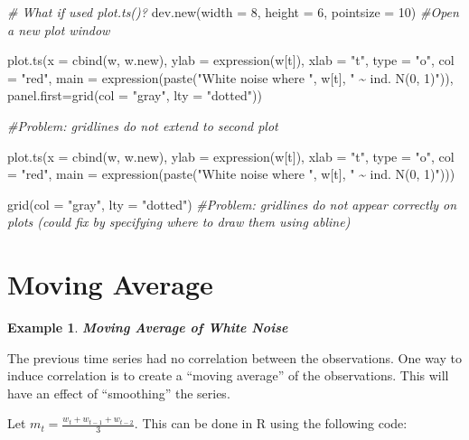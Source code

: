 \documentclass[
]{book}
\newenvironment{Shaded}{\begin{snugshade}}{\end{snugshade}}
\newcommand{\AttributeTok}[1]{\textcolor[rgb]{0.77,0.63,0.00}{#1}}
\newcommand{\CommentTok}[1]{\textcolor[rgb]{0.56,0.35,0.01}{\textit{#1}}}
\newcommand{\DecValTok}[1]{\textcolor[rgb]{0.00,0.00,0.81}{#1}}
\newcommand{\FunctionTok}[1]{\textcolor[rgb]{0.00,0.00,0.00}{#1}}
\newcommand{\NormalTok}[1]{#1}
\newcommand{\StringTok}[1]{\textcolor[rgb]{0.31,0.60,0.02}{#1}}
\theoremstyle{definition}
\theoremstyle{definition}
\newtheorem{example}{Example}[chapter]
\theoremstyle{definition}
\theoremstyle{definition}
\theoremstyle{remark}
\begin{document}
\begin{Shaded}
\begin{Highlighting}[]
\CommentTok{\# What if used plot.ts()?}
\FunctionTok{dev.new}\NormalTok{(}\AttributeTok{width =} \DecValTok{8}\NormalTok{, }\AttributeTok{height =} \DecValTok{6}\NormalTok{, }\AttributeTok{pointsize =} \DecValTok{10}\NormalTok{) }\CommentTok{\#Open a new plot window}

\FunctionTok{plot.ts}\NormalTok{(}\AttributeTok{x =} \FunctionTok{cbind}\NormalTok{(w, w.new), }\AttributeTok{ylab =} \FunctionTok{expression}\NormalTok{(w[t]), }\AttributeTok{xlab =} \StringTok{"t"}\NormalTok{, }\AttributeTok{type =} \StringTok{"o"}\NormalTok{, }\AttributeTok{col =} \StringTok{"red"}\NormalTok{, }\AttributeTok{main =} \FunctionTok{expression}\NormalTok{(}\FunctionTok{paste}\NormalTok{(}\StringTok{"White noise where "}\NormalTok{, w[t], }\StringTok{" \textasciitilde{} ind. N(0, 1)"}\NormalTok{)), }\AttributeTok{panel.first=}\FunctionTok{grid}\NormalTok{(}\AttributeTok{col =} \StringTok{"gray"}\NormalTok{, }\AttributeTok{lty =} \StringTok{"dotted"}\NormalTok{))}

\CommentTok{\#Problem: gridlines do not extend to second plot}
  
\FunctionTok{plot.ts}\NormalTok{(}\AttributeTok{x =} \FunctionTok{cbind}\NormalTok{(w, w.new), }\AttributeTok{ylab =} \FunctionTok{expression}\NormalTok{(w[t]), }\AttributeTok{xlab =} \StringTok{"t"}\NormalTok{, }\AttributeTok{type =} \StringTok{"o"}\NormalTok{, }\AttributeTok{col =} \StringTok{"red"}\NormalTok{, }\AttributeTok{main =} \FunctionTok{expression}\NormalTok{(}\FunctionTok{paste}\NormalTok{(}\StringTok{"White noise where "}\NormalTok{, w[t], }\StringTok{" \textasciitilde{} ind. N(0, 1)"}\NormalTok{)))}

\FunctionTok{grid}\NormalTok{(}\AttributeTok{col =} \StringTok{"gray"}\NormalTok{, }\AttributeTok{lty =} \StringTok{"dotted"}\NormalTok{)}
\CommentTok{\#Problem: gridlines do not appear correctly on plots (could fix by specifying where to draw them using abline)}
\end{Highlighting}
\end{Shaded}

\hypertarget{moving-average}{%
\section{Moving Average}\label{moving-average}}

\begin{example}
\textbf{\emph{Moving Average of White Noise}}

The previous time series had no correlation between the observations. One way to induce correlation is to create a ``moving average'' of the observations. This will have an effect of ``smoothing'' the series.

Let \(m_t = \frac{w_t+w_{t-1}+w_{t-2}}{3}\). This can be done in R using the following code:
\end{example}
\end{document}
